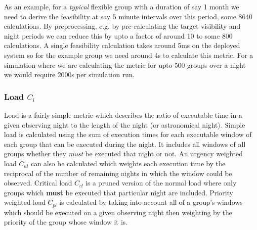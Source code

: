 As an example, for a \emph{typical} flexible group with a duration of say 1 month we need to derive the feasibility at say 5 minute intervals over this period, some 8640 calculations. By preprocessing, e.g. by pre-calculating the target visibility and night periods we can reduce this by upto a factor of around 10 to some 800 calculations. A single feasibility calculation takes around 5ms on the deployed system so for the example group we need around 4s to calculate this metric. For a simulation where we are calculating the metric for upto 500 groups over a night we would require 2000s per simulation run.





\subsubsection{Load $C_l$}
\label{sect:metric_load}
 Load is a fairly simple metric which describes the ratio of executable time in a given observing night to the length of the night (or astronomical night). Simple load is calculated using the sum of execution times for each executable window of each group that can be executed during the night. It includes all windows of all groups whether they \emph{must} be executed that night or not. An urgency weighted load $C_{ul}$  can also be calculated which weights each execution time by the reciprocal of the number of remaining nights in which the window could be observed. Critical load $C_{cl}$ is a pruned version of the normal load where only groups which {\bf must} be executed that particular night are included. Priority weighted load $C_{pl}$ is calculated by taking into account all of a group's windows which should be executed on a given observing night then weighting by the priority of the group whose window it is.

